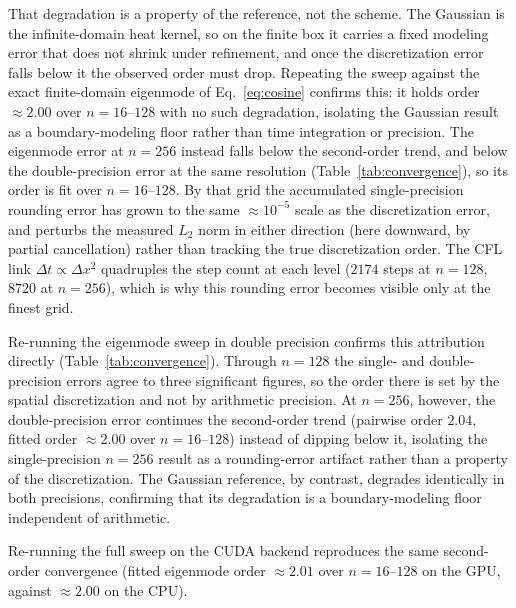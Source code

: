 \documentclass[conference]{IEEEtran}
\begin{document}
That degradation is a property of the reference, not the scheme. The Gaussian is the
infinite-domain heat kernel, so on the finite box it carries a fixed modeling error
that does not shrink under refinement, and once the discretization error falls below
it the observed order must drop. Repeating the sweep against the exact finite-domain
eigenmode of Eq.~\eqref{eq:cosine} confirms this: it holds order $\approx 2.00$ over
$n=16$--$128$ with no such degradation, isolating the Gaussian result as a
boundary-modeling floor rather than time integration or precision. The eigenmode
error at $n=256$ instead falls below the second-order trend, and below the
double-precision error at the same resolution (Table~\ref{tab:convergence}), so its
order is fit over $n=16$--$128$. By that grid the accumulated single-precision rounding
error has grown to the same $\approx 10^{-5}$ scale as the discretization error, and
perturbs the measured $L_2$ norm in either direction (here downward, by partial
cancellation) rather than tracking the true discretization order. The CFL link
$\Delta t \propto \Delta x^2$ quadruples the step count at each level ($2174$ steps at
$n=128$, $8720$ at $n=256$), which is why this rounding error becomes visible only at
the finest grid.

Re-running the eigenmode sweep in double precision confirms this attribution directly
(Table~\ref{tab:convergence}). Through $n=128$ the single- and double-precision errors
agree to three significant figures, so the order there is set by the spatial
discretization and not by arithmetic precision. At $n=256$, however, the
double-precision error continues the second-order trend (pairwise order $2.04$,
fitted order $\approx 2.00$ over $n=16$--$128$) instead of dipping below it, isolating
the single-precision $n=256$ result as a rounding-error artifact rather than a property of
the discretization. The Gaussian reference, by contrast, degrades identically in both
precisions, confirming that its degradation is a boundary-modeling floor independent of
arithmetic.

Re-running the full sweep on the CUDA backend reproduces the same second-order
convergence (fitted eigenmode order $\approx 2.01$ over $n=16$--$128$ on the GPU,
against $\approx 2.00$ on the CPU).

\begin{table}[t]
\centering
\caption{Global $L_2$ relative error under fixed-domain refinement, against the
infinite-domain Gaussian and the exact finite-domain cosine eigenmode, in single
(fp32) and double (fp64) precision. The fp32 and fp64 cosine errors agree through
$n=128$; only at $n=256$ does accumulated rounding pull the fp32 result below the trend.}
\label{tab:convergence}

\end{table}
\end{document}
